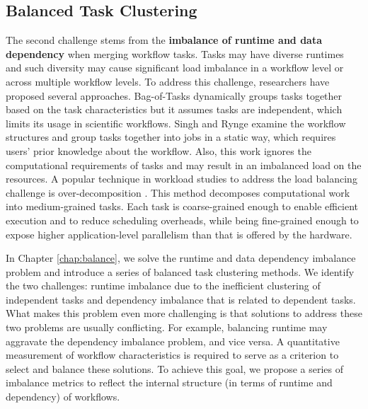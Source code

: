 \subsection{Balanced Task Clustering}

The second challenge stems from the \textbf{imbalance of runtime and data dependency} when merging workflow tasks. Tasks may have diverse runtimes and such diversity may cause significant load imbalance in a workflow level or across multiple workflow levels. To address this challenge, researchers have proposed several approaches. Bag-of-Tasks \cite{Hussin2010, Celaya2010, Oprescu2010} dynamically groups tasks together based on the task characteristics but it assumes tasks are independent, which limits its usage in scientific workflows. Singh \cite{Singh2008} and Rynge \cite{Rynge2012} examine the workflow structures and group tasks together into jobs in a static way, which requires users' prior knowledge about the workflow.
Also, this work ignores the computational requirements of tasks and may result in an imbalanced load on the resources. A popular technique in workload studies to address the load balancing challenge is over-decomposition \cite{Lifflander2012}. This method decomposes computational work into medium-grained tasks. Each task is coarse-grained enough to enable efficient execution and to reduce scheduling overheads, while being fine-grained enough to expose higher application-level parallelism than that is offered by the hardware. 

In Chapter \ref{chap:balance}, we solve the runtime and data dependency imbalance problem and introduce a series of {balanced task clustering} methods. 
We identify the two challenges: runtime imbalance due to the inefficient clustering of independent tasks and dependency imbalance that is related to dependent tasks. What makes this problem even more challenging is that solutions to address these two problems are usually conflicting. For example, balancing runtime may aggravate the dependency imbalance problem, and vice versa. A quantitative measurement of workflow characteristics is required to serve as a criterion to select and balance these solutions. To achieve this goal, we propose a series of imbalance metrics to reflect the internal structure (in terms of runtime and dependency) of workflows. 



